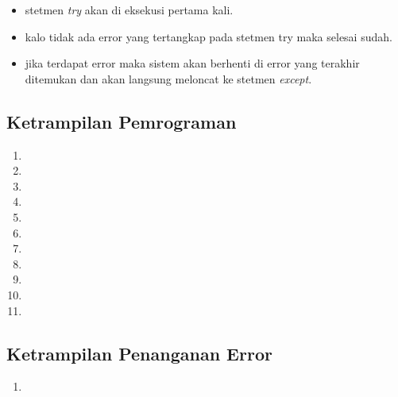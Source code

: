 \documentclass[12pt]{article}
\begin{document}
\begin{enumerate}
				\begin{itemize}
					\item stetmen \textit{try} akan di eksekusi pertama kali.
					\item kalo tidak ada error yang tertangkap pada stetmen try maka selesai sudah.
					\item jika terdapat error maka sistem akan berhenti di error yang terakhir ditemukan dan akan langsung meloncat ke stetmen \textit{except}.
				\end{itemize}
				
			
		\end{enumerate}
	\subsection{Ketrampilan Pemrograman}
			\begin{enumerate}
				\item 
				\item 
				\item 
				\item 
				\item 
				\item 
				\item 
				\item 
				\item 
				\item 
				\item 
				
			\end{enumerate}
			
	
	\subsection{Ketrampilan Penanganan Error}
		\begin{enumerate}
			\item 
			
		\end{enumerate}
\end{document}
